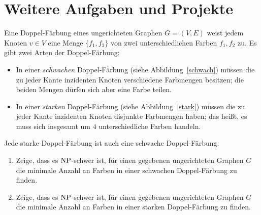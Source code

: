 \documentclass{uebung_cs}
\begin{document}
\section*{Weitere Aufgaben und Projekte}

\begin{exercise}[Doppel-Färbung][\projekt]
    Eine Doppel-Färbung eines ungerichteten Graphen $G = (V,E)$ weist jedem Knoten $v \in V$ eine Menge $\{f_1,f_2\}$ von zwei unterschiedlichen Farben $f_1,f_2$ zu. Es gibt zwei Arten der Doppel-Färbung:
    \begin{itemize}
        \item In einer \textit{schwachen} Doppel-Färbung (siehe Abbildung~\ref{schwach}) müssen die zu jeder Kante inzidenten Knoten verschiedene Farbmengen besitzen; die beiden Mengen dürfen sich aber eine Farbe teilen.
        \item In einer \textit{starken} Doppel-Färbung (siehe Abbildung~\ref{stark}) müssen die zu jeder Kante inzidenten Knoten disjunkte Farbmengen haben; das heißt, es muss sich insgesamt um $4$ unterschiedliche Farben handeln.
    \end{itemize}
    Jede starke Doppel-Färbung ist auch eine schwache Doppel-Färbung.
    \begin{enumerate}
        \item\medium Zeige, dass es $\mathrm{NP}$-schwer ist, für einen gegebenen ungerichteten Graphen $G$ die minimale Anzahl an Farben in einer schwachen Doppel-Färbung zu finden.
        \item\hard Zeige, dass es $\mathrm{NP}$-schwer ist, für einen gegebenen ungerichteten Graphen $G$ die minimale Anzahl an Farben in einer starken Doppel-Färbung zu finden.
    \end{enumerate}
    \begin{figure}[ht]
        \begin{minipage}{0.5\linewidth}
            \centering
\end{minipage}
\end{figure}
\end{exercise}
\end{document}
